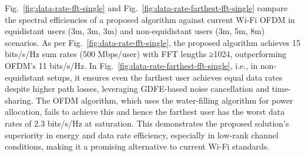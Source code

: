 Fig.~\ref{fig:data-rate-fft-single} and Fig.~\ref{fig:data-rate-farthest-fft-single} compare the spectral efficiencies of a proposed algorithm against current Wi-Fi OFDM in equidistant users (3m, 3m, 3m) and non-equidistant users (3m, 5m, 8m) scenarios. As per Fig.~\ref{fig:data-rate-fft-single}, the proposed algorithm achieves 15 bits/s/Hz sum rates (500 Mbps/user) with FFT lengths ≥1024, outperforming OFDM's 11 bits/s/Hz. In Fig.~\ref{fig:data-rate-farthest-fft-single}, i.e., in non-equidistant setups, it ensures even the farthest user achieves equal data rates despite higher path losses, leveraging GDFE-based noise cancellation and time-sharing. The OFDM algorithm, which uses the water-filling algorithm for power allocation, fails to achieve this and hence the farthest user has the worst data rates of 2.3 bits/s/Hz at saturation. This demonstrates the proposed solution's superiority in energy and data rate efficiency, especially in low-rank channel conditions, making it a promising alternative to current Wi-Fi standards.